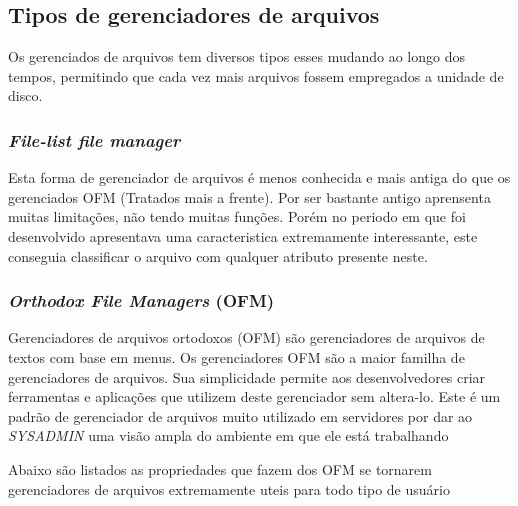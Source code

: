 \documentclass[
	12pt,				%
	openright,			%
	twoside,			%
	a4paper,			%
	chapter=TITLE,		%
	section=TITLE,		%
	english,	
	brazil				%
]{abntex2}
\begin{document}

\subsection{Tipos de gerenciadores de arquivos}

Os gerenciados de arquivos tem diversos tipos esses mudando ao longo dos tempos, permitindo que cada vez mais arquivos fossem empregados a unidade de disco.


\subsubsection{\textit{File-list file manager}}

Esta forma de gerenciador de arquivos é menos conhecida e mais antiga do que os gerenciados OFM  (Tratados mais a frente). Por ser bastante antigo aprensenta muitas limitações, não tendo muitas funções. Porém no periodo em que foi desenvolvido apresentava uma caracteristica extremamente interessante, este conseguia classificar o arquivo com qualquer atributo presente neste.

\subsubsection{\textit{Orthodox File Managers} (OFM)}


Gerenciadores de arquivos ortodoxos (OFM) são gerenciadores de arquivos de textos com base em menus. Os gerenciadores OFM são a maior familha de gerenciadores de arquivos. Sua simplicidade permite aos desenvolvedores criar ferramentas e aplicações que utilizem deste gerenciador sem altera-lo. 
Este é um padrão de gerenciador de arquivos muito utilizado em servidores por dar ao \textit{SYSADMIN} uma visão ampla do ambiente em que ele está trabalhando

Abaixo são listados as propriedades que fazem dos OFM se tornarem gerenciadores de arquivos extremamente uteis para todo tipo de usuário
\end{document}
